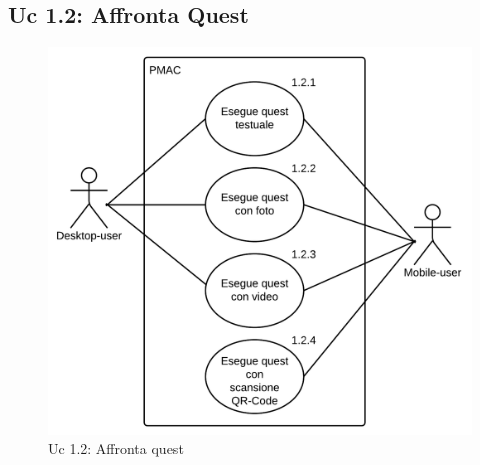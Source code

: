 \documentclass[10pt,a4paper]{article}
\begin{document}
\subsection{Uc 1.2: Affronta Quest}
\begin{figure}[ht]
\centering
\caption{Uc 1.2: Affronta quest}
\includegraphics[scale=0.87]{UseCase/Uc1_2} %
\end{figure}
\end{document}
